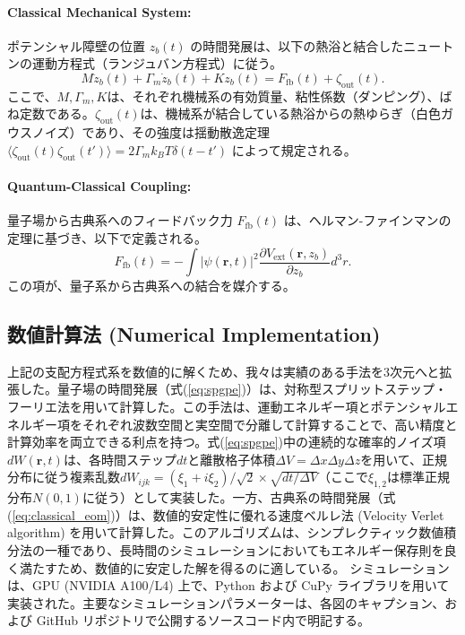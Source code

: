 \documentclass[a4paper,11pt,ja=standard,lualatex]{bxjsarticle}
\begin{document}
\paragraph{Classical Mechanical System:}
ポテンシャル障壁の位置 $z_b(t)$ の時間発展は、以下の熱浴と結合したニュートンの運動方程式（ランジュバン方程式）に従う。
\begin{equation}
    M\ddot{z}_b(t) + \Gamma_m \dot{z}_b(t) + K z_b(t) = F_{\mathrm{fb}}(t) + \zeta_{\mathrm{out}}(t).
    \label{eq:classical_eom}
\end{equation}
ここで、$M, \Gamma_m, K$は、それぞれ機械系の有効質量、粘性係数（ダンピング）、ばね定数である。$\zeta_{\mathrm{out}}(t)$は、機械系が結合している熱浴からの熱ゆらぎ（白色ガウスノイズ）であり、その強度は揺動散逸定理 $\langle \zeta_{\mathrm{out}}(t)\zeta_{\mathrm{out}}(t') \rangle = 2\Gamma_m k_B T \delta(t-t')$ によって規定される。

\paragraph{Quantum-Classical Coupling:}
量子場から古典系へのフィードバック力 $F_{\mathrm{fb}}(t)$ は、ヘルマン-ファインマンの定理に基づき、以下で定義される。
\begin{equation}
    F_{\mathrm{fb}}(t) = - \int |\psi(\mathbf{r}, t)|^2 \frac{\partial V_{\mathrm{ext}}(\mathbf{r}, z_b)}{\partial z_b} d^3r.
\end{equation}
この項が、量子系から古典系への結合を媒介する。

\subsection{数値計算法 (Numerical Implementation)}
\label{subsec:implementation}
上記の支配方程式系を数値的に解くため、我々は実績のある手法を3次元へと拡張した。量子場の時間発展（式(\ref{eq:spgpe})）は、対称型スプリットステップ・フーリエ法を用いて計算した。この手法は、運動エネルギー項とポテンシャルエネルギー項をそれぞれ波数空間と実空間で分離して計算することで、高い精度と計算効率を両立できる利点を持つ。式(\ref{eq:spgpe})中の連続的な確率的ノイズ項$dW(\mathbf{r},t)$は、各時間ステップ$dt$と離散格子体積$\Delta V = \Delta x \Delta y \Delta z$を用いて、正規分布に従う複素乱数$dW_{ijk} = (\xi_1 + i\xi_2)/\sqrt{2} \times \sqrt{dt/\Delta V}$（ここで$\xi_{1,2}$は標準正規分布$N(0,1)$に従う）として実装した。一方、古典系の時間発展（式(\ref{eq:classical_eom})）は、数値的安定性に優れる速度ベルレ法 (Velocity Verlet algorithm) を用いて計算した。このアルゴリズムは、シンプレクティック数値積分法の一種であり、長時間のシミュレーションにおいてもエネルギー保存則を良く満たすため、数値的に安定した解を得るのに適している。
シミュレーションは、GPU (NVIDIA A100/L4) 上で、Python および CuPy ライブラリを用いて実装された。主要なシミュレーションパラメーターは、各図のキャプション、および GitHub リポジトリで公開するソースコード内で明記する。
\end{document}
